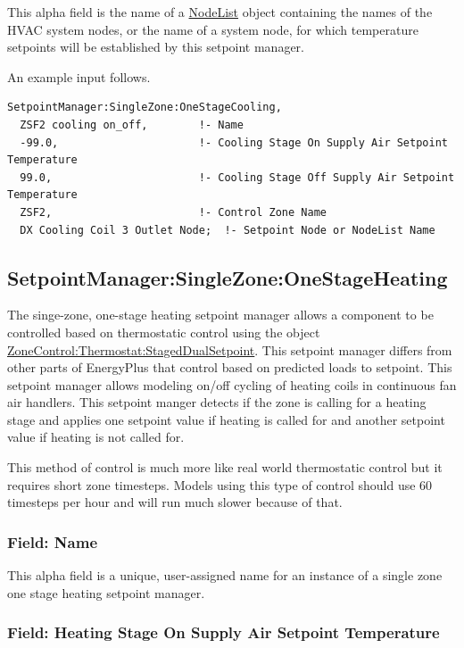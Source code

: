 This alpha field is the name of a \hyperref[nodelist]{NodeList} object containing the names of the HVAC system nodes, or the name of a system node, for which temperature setpoints will be established by this setpoint manager.

An example input follows.

\begin{lstlisting}
SetpointManager:SingleZone:OneStageCooling,
  ZSF2 cooling on_off,        !- Name
  -99.0,                      !- Cooling Stage On Supply Air Setpoint Temperature
  99.0,                       !- Cooling Stage Off Supply Air Setpoint Temperature
  ZSF2,                       !- Control Zone Name
  DX Cooling Coil 3 Outlet Node;  !- Setpoint Node or NodeList Name
\end{lstlisting}

\subsection{SetpointManager:SingleZone:OneStageHeating}\label{setpointmanagersinglezoneonestageheating}

The singe-zone, one-stage heating setpoint manager allows a component to be controlled based on thermostatic control using the object \hyperref[zonecontrolthermostatstageddualsetpoint]{ZoneControl:Thermostat:StagedDualSetpoint}. This setpoint manager differs from other parts of EnergyPlus that control based on predicted loads to setpoint. This setpoint manager allows modeling on/off cycling of heating coils in continuous fan air handlers. This setpoint manger detects if the zone is calling for a heating stage and applies one setpoint value if heating is called for and another setpoint value if heating is not called for.

This method of control is much more like real world thermostatic control but it requires short zone timesteps. Models using this type of control should use 60 timesteps per hour and will run much slower because of that.

\subsubsection{Field: Name}\label{field-name-26-001}

This alpha field is a unique, user-assigned name for an instance of a single zone one stage heating setpoint manager.

\subsubsection{Field: Heating Stage On Supply Air Setpoint Temperature}\label{field-heating-stage-on-supply-air-setpoint-temperature}

